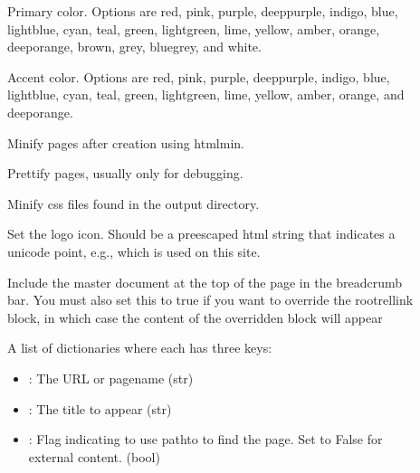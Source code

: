 \documentclass[letterpaper,10pt,english]{sphinxmanual}
\begin{document}
\begin{description}
\item[{}] \leavevmode
Primary color. Options are
red, pink, purple, deep\sphinxhyphen{}purple, indigo, blue, light\sphinxhyphen{}blue, cyan,
teal, green, light\sphinxhyphen{}green, lime, yellow, amber, orange, deep\sphinxhyphen{}orange,
brown, grey, blue\sphinxhyphen{}grey, and white.

\item[{}] \leavevmode
Accent color. Options are
red, pink, purple, deep\sphinxhyphen{}purple, indigo, blue, light\sphinxhyphen{}blue, cyan,
teal, green, light\sphinxhyphen{}green, lime, yellow, amber, orange, and deep\sphinxhyphen{}orange.

\item[{}] \leavevmode
Minify pages after creation using htmlmin.

\item[{}] \leavevmode
Prettify pages, usually only for debugging.

\item[{}] \leavevmode
Minify css files found in the output directory.

\item[{}] \leavevmode
Set the logo icon. Should be a pre\sphinxhyphen{}escaped html string that indicates a
unicode point, e.g.,  which is used on this site.

\item[{}] \leavevmode
Include the master document at the top of the page in the breadcrumb bar.
You must also set this to true if you want to override the rootrellink block, in which
case the content of the overridden block will appear

\item[{}] \leavevmode
A list of dictionaries where each has three keys:
\begin{itemize}
\item {} 
: The URL or pagename (str)

\item {} 
: The title to appear (str)

\item {} 
: Flag indicating to use pathto to find the page.  Set to False for
external content. (bool)


\end{itemize}
\end{description}
\end{document}
